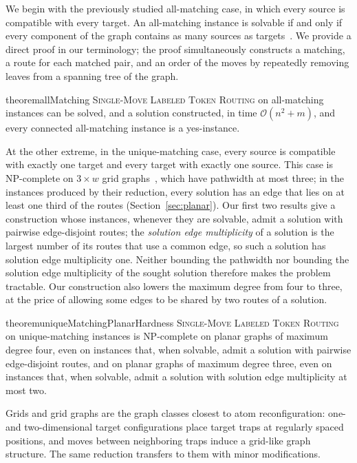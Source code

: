 \documentclass[a4paper,USenglish,thm-restate]{lipics-v2021}
\theoremstyle{problemstyle}
\begin{document}
We begin with the previously studied all-matching case, in which every source is
compatible with every target. An all-matching instance is solvable if and
only if every component of the graph contains as many sources as
targets~\cite{Calinescu2008Reconfigurations}. We provide a direct proof in
our terminology; the proof simultaneously constructs a matching, a route for
each matched pair, and an order of the moves by repeatedly removing leaves
from a spanning tree of the graph.
\begin{restatable}{theorem}{allMatching}
\label{thm:allMatching}
\textsc{Single-Move Labeled Token Routing} on all-matching instances can be
solved, and a solution constructed, in time $\mathcal{O}(n^2+m)$, and every connected all-matching instance
is a yes-instance.
\end{restatable}

At the other extreme, in the unique-matching case, every source is
compatible with exactly one target and every target with exactly one source.
This case is \textsf{NP}-complete on $3\times w$ grid
graphs~\cite{GeftHalperinNakar2024}, which have pathwidth at most three; in the instances produced by their reduction, every solution has an edge that lies on at least one third of the routes (Section~\ref{sec:planar}).
Our first two results give a construction whose instances, whenever they are
solvable, admit a solution with pairwise edge-disjoint routes; the
\emph{solution edge multiplicity} of a solution is the largest number of its
routes that use a common edge, so such a solution has solution edge
multiplicity one. Neither bounding the pathwidth nor
bounding the solution edge multiplicity of the sought solution therefore
makes the problem tractable. Our construction also lowers the maximum degree from four to
three, at the price of allowing some edges to be shared by two routes of a
solution.


\begin{restatable}{theorem}{uniqueMatchingPlanarHardness}
\label{thm:unique_matching_planar_hardness}
\textsc{Single-Move Labeled Token Routing} on unique-matching instances is
\textsf{NP}-complete on planar graphs of maximum degree four, even on
instances that, when solvable, admit a solution with pairwise edge-disjoint
routes, and on planar graphs of maximum degree three, even on instances
that, when solvable, admit a solution with solution edge multiplicity at
most two.
\end{restatable}


Grids and grid graphs are the graph classes closest to atom reconfiguration:
one- and two-dimensional target configurations place target traps at
regularly spaced positions, and moves between neighboring traps induce a
grid-like graph structure. The same reduction transfers to them with minor
modifications.
\end{document}
